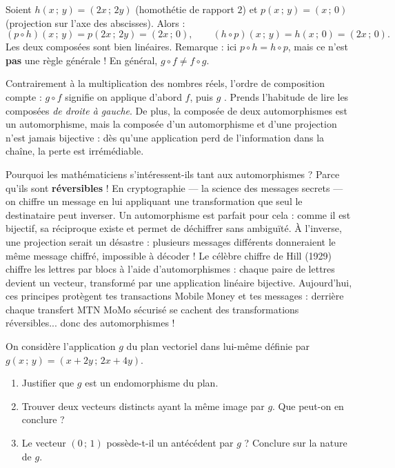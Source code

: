 \documentclass[11pt]{article}
\begin{document}
\begin{exemplebox}
Soient $h(x\,;\,y) = (2x\,;\,2y)$ (homothétie de rapport $2$) et $p(x\,;\,y) = (x\,;\,0)$ (projection sur l'axe des abscisses). Alors :
\[ (p \circ h)(x\,;\,y) = p(2x\,;\,2y) = (2x\,;\,0), \qquad (h \circ p)(x\,;\,y) = h(x\,;\,0) = (2x\,;\,0). \]
Les deux composées sont bien linéaires. Remarque : ici $p \circ h = h \circ p$, mais ce n'est \textbf{pas} une règle générale ! En général, $g \circ f \neq f \circ g$.
\end{exemplebox}

\begin{attention}
Contrairement à la multiplication des nombres réels, l'ordre de composition compte : $g \circ f$ signifie \og on applique d'abord $f$, puis $g$ \fg{}. Prends l'habitude de lire les composées \emph{de droite à gauche}. De plus, la composée de deux automorphismes est un automorphisme, mais la composée d'un automorphisme et d'une projection n'est jamais bijective : dès qu'une application \og perd de l'information \fg{} dans la chaîne, la perte est irrémédiable.
\end{attention}

\begin{savaistu}
Pourquoi les mathématiciens s'intéressent-ils tant aux automorphismes ? Parce qu'ils sont \textbf{réversibles} ! En cryptographie — la science des messages secrets — on chiffre un message en lui appliquant une transformation que seul le destinataire peut inverser. Un automorphisme est parfait pour cela : comme il est bijectif, sa réciproque existe et permet de déchiffrer sans ambiguïté. À l'inverse, une projection serait un désastre : plusieurs messages différents donneraient le même message chiffré, impossible à décoder ! Le célèbre chiffre de Hill (1929) chiffre les lettres par blocs à l'aide d'automorphismes : chaque paire de lettres devient un vecteur, transformé par une application linéaire bijective. Aujourd'hui, ces principes protègent tes transactions Mobile Money et tes messages : derrière chaque transfert MTN MoMo sécurisé se cachent des transformations réversibles... donc des automorphismes !
\end{savaistu}

\begin{exercice}
On considère l'application $g$ du plan vectoriel dans lui-même définie par $g(x\,;\,y) = (x + 2y\,;\,2x + 4y)$.
\begin{enumerate}
\item Justifier que $g$ est un endomorphisme du plan.
\item Trouver deux vecteurs distincts ayant la même image par $g$. Que peut-on en conclure ?
\item Le vecteur $(0\,;\,1)$ possède-t-il un antécédent par $g$ ? Conclure sur la nature de $g$.
\end{enumerate}
\end{exercice}
\end{document}
